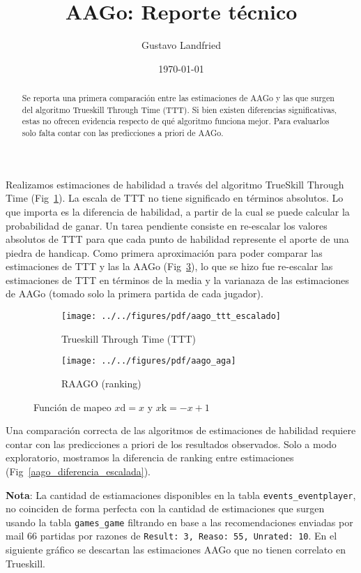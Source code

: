 \documentclass[a4paper,10pt]{article}
\title{AAGo: Reporte t\'ecnico}
\author{Gustavo Landfried}
\date{\today}
\begin{document}
\maketitle

\begin{abstract}
Se reporta una primera comparaci\'on entre las estimaciones de AAGo y las que surgen del algoritmo Trueskill Through Time (TTT). 
Si bien existen diferencias significativas, estas no ofrecen evidencia respecto de qu\'e algoritmo funciona mejor.
Para evaluarlos solo falta contar con las predicciones a priori de AAGo. 
\end{abstract}

Realizamos estimaciones de habilidad a trav\'es del algoritmo TrueSkill Through Time (Fig~\ref{aago_ttt_escalado}).
La escala de TTT no tiene significado en t\'erminos absolutos.
Lo que importa es la diferencia de habilidad, a partir de la cual se puede calcular la probabilidad de ganar.
Un tarea pendiente consiste en re-escalar los valores absolutos de TTT para que cada punto de habilidad represente el aporte de una piedra de handicap.
Como primera aproximaci\'on para poder comparar las estimaciones de TTT y las la AAGo (Fig~\ref{aago_aga}), lo que se hizo fue re-escalar las estimaciones de TTT en t\'erminos de la media y la varianaza de las estimaciones de AAGo (tomado solo la primera partida de cada jugador).

 \begin{figure}[H]\centering
\begin{subfigure}[t]{0.48\textwidth}
\texttt{[image: ../../figures/pdf/aago\_ttt\_escalado]} 
\caption{Trueskill Through Time (TTT)}
\label{aago_ttt_escalado}
\end{subfigure}
\begin{subfigure}[t]{0.48\textwidth}
\texttt{[image: ../../figures/pdf/aago\_aga]} 
\caption{RAAGO (ranking)}
\label{aago_aga}
\end{subfigure}
\caption{Funci\'on de mapeo $x\text{d} = x$ y $x\text{k} = -x + 1$}
\end{figure}

Una comparaci\'on correcta de las algoritmos de estimaciones de habilidad requiere contar con las predicciones a priori de los resultados observados.
Solo a modo exploratorio, mostramos la diferencia de ranking entre estimaciones (Fig~\ref{aago_diferencia_escalada}). 

\vspace{0.3cm}

\textbf{Nota}: La cantidad de estiamaciones disponibles en la tabla \texttt{events\_eventplayer}, no coinciden de forma perfecta con la cantidad de estimaciones que surgen usando la tabla \texttt{games\_game} filtrando en base a las recomendaciones enviadas por mail 66 partidas por razones de \texttt{Result: 3, Reaso: 55, Unrated: 10}. En el siguiente gr\'afico se descartan las estimaciones AAGo que no tienen correlato en Trueskill.
\end{document}
